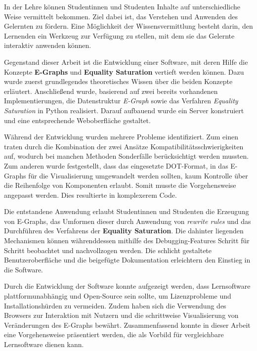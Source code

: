 In der Lehre können Studentinnen und Studenten Inhalte auf unterschiedliche Weise vermittelt bekommen. Ziel dabei ist, das Verstehen und Anwenden des Gelernten zu fördern.
Eine Möglichkeit der Wissensvermittlung besteht darin, den Lernenden ein Werkzeug zur Verfügung zu stellen, mit dem sie das Gelernte interaktiv anwenden können.

Gegenstand dieser Arbeit ist die Entwicklung einer Software, mit deren Hilfe die Konzepte \textbf{E-Graphs} und \textbf{Equality Saturation} vertieft werden können.
Dazu wurde zuerst grundlegendes theoretisches Wissen über die beiden Konzepte erläutert. 
Anschließend wurde, basierend auf zwei bereits vorhandenen Implementierungen, die Datenstruktur \textit{E-Graph} sowie das Verfahren \textit{Equality Saturation} in Python realisiert. 
Darauf aufbauend wurde ein Server konstruiert und eine entsprechende Weboberfläche gestaltet.

Während der Entwicklung wurden mehrere Probleme identifiziert. Zum einen traten durch die Kombination der zwei Ansätze Kompatibilitätsschwierigkeiten auf, wodurch bei manchen
Methoden Sonderfälle berücksichtigt werden mussten. Zum anderen wurde festgestellt, dass das eingesetzte DOT-Format, in das E-Graphs für die Visualisierung umgewandelt werden sollten, 
kaum Kontrolle über die Reihenfolge von Komponenten erlaubt. Somit musste die Vorgehensweise angepasst werden. Dies resultierte in komplexerem Code.

Die entstandene Anwendung erlaubt Studentinnen und Studenten die Erzeugung von E-Graphs, das Umformen dieser durch Anwendung von \textit{rewrite rules} und das Durchführen
des Verfahrens der \textbf{Equality Saturation}. Die dahinter liegenden Mechanismen können währenddessen mithilfe des Debugging-Features Schritt für Schritt beobachtet und nachvollzogen werden.
Die schlicht gestaltete Benutzeroberfläche und die beigefügte Dokumentation erleichtern den Einstieg in die Software. 

Durch die Entwicklung der Software konnte aufgezeigt werden, dass Lernsoftware plattformunabhängig und Open-Source sein sollte, um Lizenzprobleme und Installationshürden zu vermeiden.
Zudem haben sich die Verwendung des Browsers zur Interaktion mit Nutzern und die schrittweise Visualisierung von Veränderungen des E-Graphs bewährt. 
Zusammenfassend konnte in dieser Arbeit eine Vorgehensweise präsentiert werden, die als Vorbild für vergleichbare Lernsoftware dienen kann.

